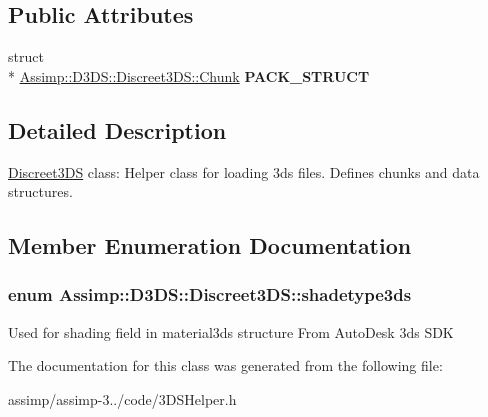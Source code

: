 \subsection*{Public Attributes}
\begin{DoxyCompactItemize}
\item 
\hypertarget{class_assimp_1_1_d3_d_s_1_1_discreet3_d_s_a98c6030001001d54c3f0fcab90c1d4a2}{struct \\*
\hyperlink{struct_assimp_1_1_d3_d_s_1_1_discreet3_d_s_1_1_chunk}{Assimp\+::\+D3\+D\+S\+::\+Discreet3\+D\+S\+::\+Chunk} {\bfseries P\+A\+C\+K\+\_\+\+S\+T\+R\+U\+C\+T}}\label{class_assimp_1_1_d3_d_s_1_1_discreet3_d_s_a98c6030001001d54c3f0fcab90c1d4a2}

\end{DoxyCompactItemize}


\subsection{Detailed Description}
\hyperlink{class_assimp_1_1_d3_d_s_1_1_discreet3_d_s}{Discreet3\+D\+S} class\+: Helper class for loading 3ds files. Defines chunks and data structures. 

\subsection{Member Enumeration Documentation}
\hypertarget{class_assimp_1_1_d3_d_s_1_1_discreet3_d_s_aea20f1be654c4f3655b9b6e55518e237}{
\subsubsection[{shadetype3ds}]{\setlength{\rightskip}{0pt plus 5cm}enum {\bf Assimp\+::\+D3\+D\+S\+::\+Discreet3\+D\+S\+::shadetype3ds}}}\label{class_assimp_1_1_d3_d_s_1_1_discreet3_d_s_aea20f1be654c4f3655b9b6e55518e237}
Used for shading field in material3ds structure From Auto\+Desk 3ds S\+D\+K 

The documentation for this class was generated from the following file\+:\begin{DoxyCompactItemize}
\item 
assimp/assimp-\/3../code/3\+D\+S\+Helper.\+h\end{DoxyCompactItemize}
